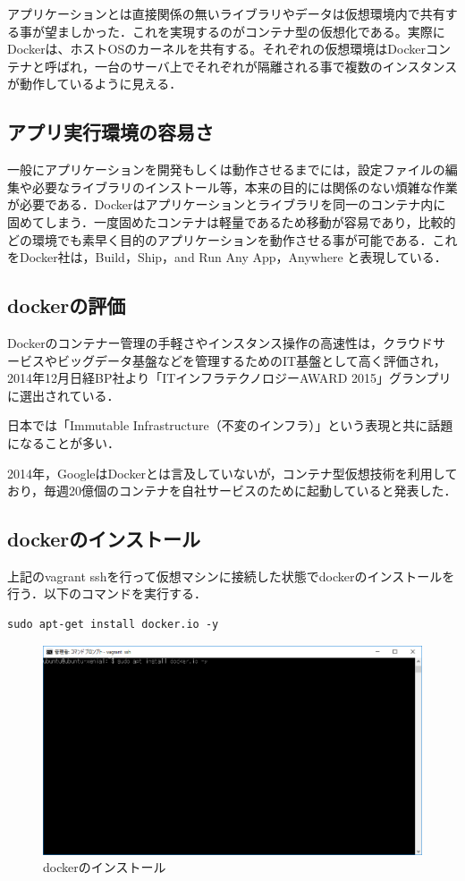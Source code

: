 アプリケーションとは直接関係の無いライブラリやデータは仮想環境内で共有する事が望ましかった．これを実現するのがコンテナ型の仮想化である。実際にDockerは、ホストOSのカーネルを共有する。それぞれの仮想環境はDockerコンテナと呼ばれ，一台のサーバ上でそれぞれが隔離される事で複数のインスタンスが動作しているように見える．


\subsection{アプリ実行環境の容易さ}
一般にアプリケーションを開発もしくは動作させるまでには，設定ファイルの編集や必要なライブラリのインストール等，本来の目的には関係のない煩雑な作業が必要である．Dockerはアプリケーションとライブラリを同一のコンテナ内に固めてしまう．一度固めたコンテナは軽量であるため移動が容易であり，比較的どの環境でも素早く目的のアプリケーションを動作させる事が可能である．これをDocker社は，Build，Ship，and Run Any App，Anywhere と表現している\cite{d}．

\subsection{dockerの評価}
Dockerのコンテナー管理の手軽さやインスタンス操作の高速性は，クラウドサービスやビッグデータ基盤などを管理するためのIT基盤として高く評価され，2014年12月日経BP社より「ITインフラテクノロジーAWARD 2015」グランプリに選出されている．


日本では「Immutable Infrastructure（不変のインフラ）」という表現と共に話題になることが多い．


2014年，GoogleはDockerとは言及していないが，コンテナ型仮想技術を利用しており，毎週20億個のコンテナを自社サービスのために起動していると発表した．


\newpage

\subsection{dockerのインストール}
上記のvagrant sshを行って仮想マシンに接続した状態でdockerのインストールを行う．以下のコマンドを実行する．

\begin{verbatim}
sudo apt-get install docker.io -y
\end{verbatim}

\begin{figure}[h]
\centering
\includegraphics[width=12cm]{dockerinstall.png}
\caption{dockerのインストール}\label{サンプル図}
\end{figure}


